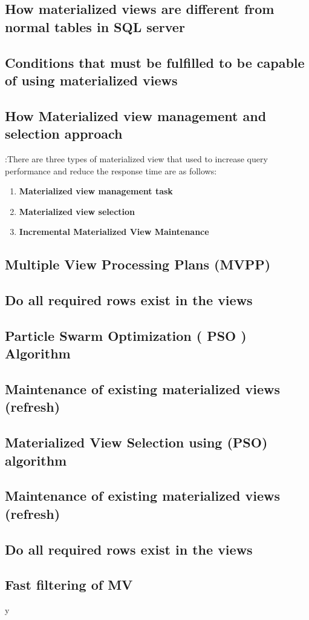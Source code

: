 \subsection{How  materialized views are different from normal tables in  SQL server }
\subsection{Conditions that must be fulfilled to be capable of using materialized views }

\subsection{ How Materialized view management and selection approach} :There are three types of materialized view that used to increase query performance and reduce the response time are as follows:

\begin{enumerate}[label=\alph*)]
    \item \textbf{Materialized view management task}
    \item \textbf{Materialized view selection}
    \item \textbf{Incremental Materialized View Maintenance}
\end{enumerate}

\subsection{Multiple View Processing Plans (MVPP) }
\subsection{Do all required rows exist in the views }
\subsection{Particle Swarm Optimization ( PSO ) Algorithm
 }
\subsection{Maintenance of existing materialized views (refresh)
}
\subsection{Materialized View Selection using (PSO) algorithm }
\subsection{Maintenance of existing materialized views (refresh)
}
\subsection{Do all required rows exist in the views }
\subsection{Fast filtering of MV}y